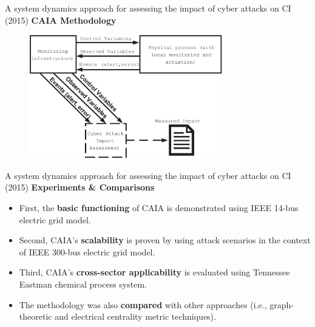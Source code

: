 \documentclass[compress]{beamer}
\begin{document}
\begin{frame}{A system dynamics approach for assessing the impact of cyber attacks on CI (2015)}
    \textbf{CAIA Methodology}
    \begin{figure}
      \centering
      \includegraphics[width = 0.75\textwidth]{./images/caia-method.png}
      \label{fig:caia-method}
    \end{figure}
\end{frame}
\begin{frame}{A system dynamics approach for assessing the impact of cyber attacks on CI (2015)}
    \textbf{Experiments \& Comparisons}
    \begin{itemize}
     \item First, the \textbf{basic functioning} of CAIA is demonstrated using IEEE 14-bus electric grid model.
     \item Second, CAIA's \textbf{scalability} is proven by using attack scenarios in the context of IEEE 300-bus electric grid model.
     \item Third, CAIA's \textbf{cross-sector applicability} is evaluated using Tennessee Eastman chemical process system.
     \item The methodology was also \textbf{compared} with other approaches (i.e., graph-theoretic and electrical centrality metric techniques).
    \end{itemize}
\end{frame}
\end{document}
